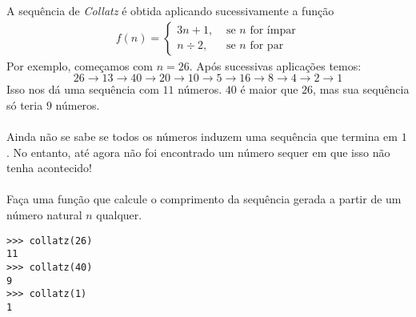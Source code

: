 \documentclass[12pt]{article}
\begin{document}
	A sequência de \emph{Collatz} é obtida aplicando sucessivamente a função
	{\large
	\begin{align*}
		f(n) = \begin{cases}
		3n + 1, &\text{ se } n \text{ for ímpar}\\
		n \div 2, &\text{ se } n \text{ for par}
		\end{cases}
	\end{align*}
	}
	Por exemplo, começamos com $n = 26$. Após sucessivas aplicações temos:
		$$26 \to 13 \to 40 \to 20 \to 10 \to 5 \to 16 \to 8 \to 4 \to 2 \to 1$$
	Isso nos dá uma sequência com $11$ números. $40$ é maior que $26$, mas sua sequência só teria $9$ números.\\
	\\
	Ainda não se sabe se todos os números induzem uma sequência que termina em $1$. No entanto, até agora não foi encontrado um número sequer em que isso não tenha acontecido!\\
	\\
	\quest Faça uma função que calcule o comprimento da sequência gerada a partir de um número natural $n$ qualquer.\\

	\example
	\begin{lstlisting}
>>> collatz(26)
11
>>> collatz(40)
9
>>> collatz(1)
1
	\end{lstlisting}
	
\end{document}
